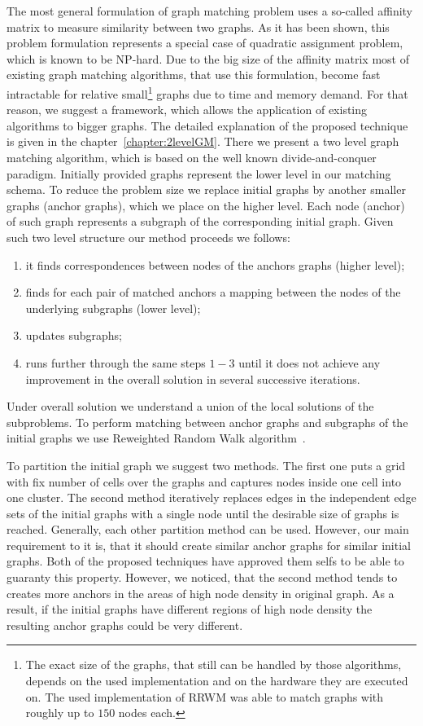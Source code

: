 The most general formulation of graph matching problem uses a so-called affinity matrix to measure similarity between two graphs. As it has been shown, this problem formulation represents a special case of quadratic assignment problem, which is known to be NP-hard. Due to the big size of the affinity matrix most of existing graph matching algorithms, that use this formulation, become fast intractable for relative small\footnote{The exact size of the graphs, that still can be handled by those algorithms, depends on the used implementation and on the hardware they are executed on. The used implementation of RRWM was able to match graphs with roughly up to $150$ nodes each.} graphs due to time and memory demand. For that reason, we suggest a framework, which allows the application of existing algorithms to bigger graphs. The detailed explanation of the proposed technique is given in the chapter~\ref{chapter:2levelGM}. There we present a two level graph matching algorithm, which is based on the well known divide-and-conquer paradigm. Initially provided graphs represent the lower level in our matching schema. To reduce the problem size we replace initial graphs by another smaller graphs (anchor graphs), which we place on the higher level. Each node (anchor) of such graph represents a subgraph of the corresponding initial graph. Given such two level structure our method proceeds we follows:
\begin{enumerate}
\item it finds correspondences between nodes of the anchors graphs (higher level);
\item finds for each pair of matched anchors a mapping between the nodes of the underlying subgraphs (lower level);
\item updates subgraphs;
\item runs further through the same steps $1-3$ until it does not achieve any improvement in the overall solution in several successive iterations.
\end{enumerate}
Under overall solution we understand a union of the local solutions of the subproblems. To perform matching between anchor graphs and subgraphs of the initial graphs we use Reweighted Random Walk algorithm~\cite{Cho2010_RRWM}.

To partition the initial graph we suggest two methods. The first one puts a grid with fix number of cells over the graphs and captures nodes inside one cell into one cluster. The second method iteratively replaces edges in the independent edge sets of the initial graphs with a single node until the desirable size of graphs is reached. Generally, each other partition method can be used. However, our main requirement to it is, that it should create similar anchor graphs for similar initial graphs. Both of the proposed techniques have approved them selfs to be able to guaranty this property. However, we noticed, that the second method tends to creates more anchors in the areas of high node density in original graph. As a result, if the initial graphs have different regions of high node density the resulting anchor graphs could be very different.

